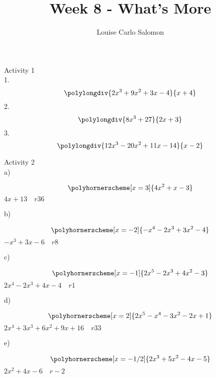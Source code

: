 \documentclass{article}
\title{Week 8 - What's More}
\author{Louise Carlo Salomon}
\date{}
\begin{document}
    \maketitle
    Activity 1\\
    1.\begin{equation}
        \polylongdiv{2x^3+9x^2+3x-4}{x+4}
    \end{equation}
    2.\begin{equation}
        \polylongdiv{8x^3+27}{2x+3}
    \end{equation}
    3. \begin{equation}
        \polylongdiv{12x^3-20x^2+11x-14}{x-2}
    \end{equation}
    \newpage
    \par Activity 2 \\
    a) 
    \begin{center}
    \begin{equation}
        \polyhornerscheme[x=3]{4x^2+x-3}
    \end{equation}
    $4x+13\quad r36$
    \end{center}
    b)
    \begin{center} 
    \begin{equation}
        \polyhornerscheme[x=-2]{-x^4-2x^3+3x^2-4}
    \end{equation}
    $-x^3+3x-6\quad r8$
    \end{center}
    c)
    \begin{center} 
    \begin{equation}
        \polyhornerscheme[x=-1]{2x^5-2x^3+4x^2-3}
    \end{equation}
    $2x^4-2x^3+4x-4\quad r1$
    \end{center}
    d)
    \begin{center} 
    \begin{equation}
        \polyhornerscheme[x=2]{2x^5-x^4-3x^2-2x+1}
    \end{equation}
    $2x^4+3x^3+6x^2+9x+16\quad r33$
    \end{center}
    e)
    \begin{center}    
    \begin{equation}
        \polyhornerscheme[x=-1/2]{2x^3+5x^2-4x-5}
    \end{equation}
    $2x^2+4x-6 \quad r-2$
    \end{center}
\end{document}
